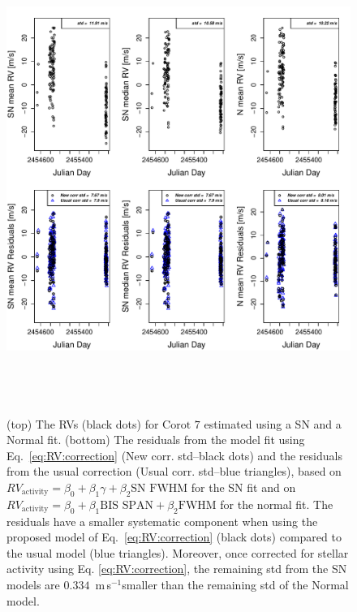 \documentclass{aa}
\def\ms{\hbox{\,m\,s$^{-1}$}}         %
\begin{document}
\begin{figure} 
\begin{center}
\includegraphics[height = 6in]{NEW_CORRECTIONLRa01_E_[3]CorrectionActivity_RadialVelocity_vs_time.pdf} 
   \caption{(top) The RVs (black dots) for $\text{Corot }7$ estimated using a SN and a Normal fit.
 (bottom) The residuals from the model fit using Eq.~\eqref{eq:RV:correction} (New corr. std--black dots) and the residuals from the usual correction (Usual corr. std--blue triangles), based on $RV_{\text{activity}}=\beta_0+\beta_1 \gamma + \beta_2 \text{SN FWHM}$ for the SN fit and on $RV_{\text{activity}}=\beta_0+\beta_1 \text{BIS SPAN} + \beta_2 \text{FWHM}$ for the normal fit. The residuals have a smaller systematic component when using the proposed model of Eq.~\eqref{eq:RV:correction} (black dots) compared to the usual model (blue triangles). Moreover, once corrected for stellar activity using Eq. \ref{eq:RV:correction}, the remaining std from the SN models are $0.334$ \ms smaller than the remaining std of the Normal model.}
   \label{fig:Corot-7:correctionRV}
\end{center}
\end{figure}
\end{document}
